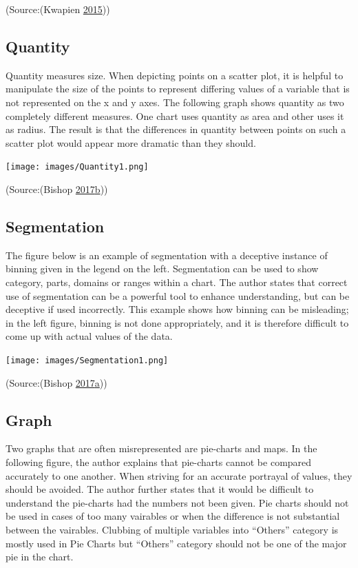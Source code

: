 \documentclass[]{book}
\begin{document}
(Source:(Kwapien \protect\hyperlink{ref-misleading_data}{2015}))

\hypertarget{quantity}{%
\subsection{Quantity}\label{quantity}}

Quantity measures size. When depicting points on a scatter plot, it is helpful to manipulate the size of the points to represent differing values of a variable that is not represented on the x and y axes. The following graph shows quantity as two completely different measures. One chart uses quantity as area and other uses it as radius. The result is that the differences in quantity between points on such a scatter plot would appear more dramatic than they should.

\texttt{[image: images/Quantity1.png]}

(Source:(Bishop \protect\hyperlink{ref-study_asks}{2017}\protect\hyperlink{ref-study_asks}{b}))

\hypertarget{segmentation}{%
\subsection{Segmentation}\label{segmentation}}

The figure below is an example of segmentation with a deceptive instance of binning given in the legend on the left.
Segmentation can be used to show category, parts, domains or ranges within a chart. The author states that correct use of segmentation can be a powerful tool to enhance understanding, but can be deceptive if used incorrectly. This example shows how binning can be misleading; in the left figure, binning is not done appropriately, and it is therefore difficult to come up with actual values of the data.

\texttt{[image: images/Segmentation1.png]}

(Source:(Bishop \protect\hyperlink{ref-visual-lies}{2017}\protect\hyperlink{ref-visual-lies}{a}))

\hypertarget{graph}{%
\subsection{Graph}\label{graph}}

Two graphs that are often misrepresented are pie-charts and maps. In the following figure, the author explains that pie-charts cannot be compared accurately to one another. When striving for an accurate portrayal of values, they should be avoided. The author further states that it would be difficult to understand the pie-charts had the numbers not been given. Pie charts should not be used in cases of too many vairables or when the difference is not substantial between the vairables. Clubbing of multiple variables into ``Others'' category is mostly used in Pie Charts but ``Others'' category should not be one of the major pie in the chart.
\end{document}
